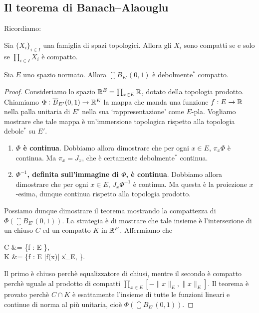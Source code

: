 \subsection{Il teorema di Banach--Alaouglu}
Ricordiamo:

\begin{theorem}[Tychonoff]
\label{th:tychonoff}
	Sia $\{X_i\}_{i \in I}$ una famiglia di spazi topologici.
	Allora gli $X_i$ sono compatti se e solo se $\prod_{i \in I} X_i$ è compatto.
\end{theorem}

\begin{theorem}
\label{th:banach_alaouglu}
	Sia $E$ uno spazio normato.
	Allora $\closure B_{E'}(0,1)$ è debolmente$^*$ compatto.
\end{theorem}
\begin{proof}
	Consideriamo lo spazio $\mathbb{R}^E = \prod_{x \in E} \mathbb{R}$, dotato della topologia prodotto.
	Chiamiamo $\Phi : \overline{B}_{E'}(0,1) \to \mathbb{R}^E$ la mappa che manda una funzione $f : E \to \mathbb{R}$ nella palla unitaria di $E'$ nella sua `rappresentazione' come $E$-pla. Vogliamo mostrare che tale mappa è un'immersione topologica rispetto alla topologia debole$^*$ su $E'$.
	\begin{enumerate}
		\item \textbf{$\Phi$ è continua}. Dobbiamo allora dimostrare che per ogni $x \in E$, $\pi_x \Phi$ è continua. Ma $\pi_x = J_x$, che è certamente debolmente$^*$ continua.
		\item \textbf{$\Phi^{-1}$, definita sull'immagine di $\Phi$, è continua}. Dobbiamo allora dimostrare che per ogni $x \in E$, $J_x \Phi^{-1}$ è continua. Ma questa è la proiezione $x$-esima, dunque continua rispetto alla topologia prodotto.
	\end{enumerate}
	Possiamo dunque dimostrare il teorema mostrando la compattezza di $\Phi(\closure B_{E'}(0,1))$. La strategia è di mostrare che tale insieme è l'intersezione di un chiuso $C$ ed un compatto $K$ in $\mathbb{R}^E$. Affermiamo che
	\begin{eqalign*}
		C &= \{f : E \to \R \suchthat {}\},\\
		K &= \{f : E \to \R \suchthat |f(x)| \leq \|x\|_E, \}.
	\end{eqalign*}
	Il primo è chiuso perchè equalizzatore di chiusi, mentre il secondo è compatto perchè uguale al prodotto di compatti $\prod_{x \in E} [-\|x\|_E, \|x\|_E]$. Il teorema è provato perchè $C \cap K$ è esattamente l'insieme di tutte le funzioni lineari e continue di norma al più unitaria, cioè $\Phi(\closure B_{E'}(0,1))$.
\end{proof}

